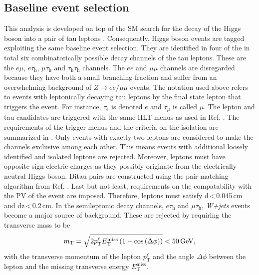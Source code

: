 
\subsection{Baseline event selection}\label{sec:baseline}
This analysis is developed on top of the SM search for the decay of the Higgs boson into a pair of tau leptons \cite{Sirunyan:2017khh}. Consequently, Higgs boson events are tagged exploiting the same baseline event selection. 
They are identified in four of the in total six combinatorically possible decay channels of the tau leptons. These are the $e\mu$, $e\tau_\text{h}$, $\mu\tau_\text{h}$ and $\tau_\text{h}\tau_\text{h}$ channels.
The $ee$ and $\mu\mu$ channels are disregarded because they have both a small branching fraction and suffer from an overwhelming background of $Z\rightarrow ee/\mu\mu$ events. 
The notation used above refers to events with leptonically decaying tau leptons by the final state lepton that triggers the event. For instance, $\tau_\text{e}$ is denoted $e$ and $\tau_\mu$ is called $\mu$.
The lepton and tau candidates are triggered with the same HLT menus as used in Ref. \cite{Sirunyan:2017khh}. The requirements of the trigger menus and the criteria on the isolation are summarized in . 
Only events with exactly two leptons are considered to make the channels exclusive among each other. This means events with additional loosely identified and isolated leptons are rejected. Moreover, leptons must have opposite-sign electric
charges as they possibly originate from the electrically neutral Higgs boson. Ditau pairs are constructed using the pair matching algorithm from Ref. \cite{Sirunyan:2017khh}. 
Last but not least, requirements on the compatability with the PV of the event are imposed. Therefore, leptons must satisfy d\,<\,0.045\,{cm} and d\textunderscript z\,<\,0.2\,{cm}. \newline{} 
In the semileptonic decay channels, $e\tau_\text{h}$ and $\mu\tau_\text{h}$, \textit{W+jets} events become a major source of background. These are rejected by requiring the transverse mass to be
\begin{equation}
    m_\text{T} = \sqrt{2p^\ell_\text{T} E_\text{T}^{\text{miss}} \left( 1- \cos \left( \Delta \phi \right) \right)} < \text{50\,{GeV}},
\end{equation}
with the transverse momentum of the lepton $p^\ell_\text{T}$ and the angle $\Delta\phi$ between the lepton and the missing transverse energy $E_\text{T}^\text{miss}$. 
